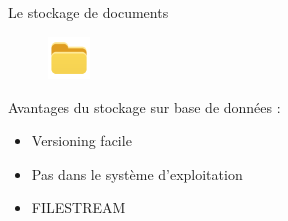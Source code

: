 \begin{frame}{Le stockage de documents}
\begin{figure}[h!]
  \includegraphics[width=0.10\textwidth]{images/iconfinder_website_-_folder_3440836}
\end{figure}
 Avantages du stockage sur base de données :
  \begin{itemize}
  \item Versioning facile
  \item Pas dans le système d'exploitation
  \item FILESTREAM
  \end{itemize}
\end{frame}